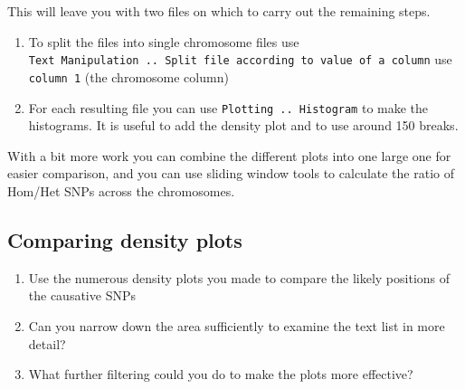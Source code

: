 \documentclass[12pt,]{book}
\providecommand{\tightlist}{%
  \setlength{\itemsep}{0pt}\setlength{\parskip}{0pt}}
\begin{document}
This will leave you with two files on which to carry out the remaining
steps.

\begin{enumerate}
\def\labelenumi{\arabic{enumi}.}
\setcounter{enumi}{4}
\tightlist
\item
  To split the files into single chromosome files use
  \texttt{Text\ Manipulation\ ..\ Split\ file\ according\ to\ value\ of\ a\ column}
  use \texttt{column\ 1} (the chromosome column)
\item
  For each resulting file you can use \texttt{Plotting\ ..\ Histogram}
  to make the histograms. It is useful to add the density plot and to
  use around 150 breaks.
\end{enumerate}

With a bit more work you can combine the different plots into one large
one for easier comparison, and you can use sliding window tools to
calculate the ratio of Hom/Het SNPs across the chromosomes.

\subsection{Comparing density plots}\label{comparing-density-plots}

\begin{enumerate}
\def\labelenumi{\arabic{enumi}.}
\tightlist
\item
  Use the numerous density plots you made to compare the likely
  positions of the causative SNPs
\item
  Can you narrow down the area sufficiently to examine the text list in
  more detail?
\item
  What further filtering could you do to make the plots more effective?
\end{enumerate}


\end{document}
